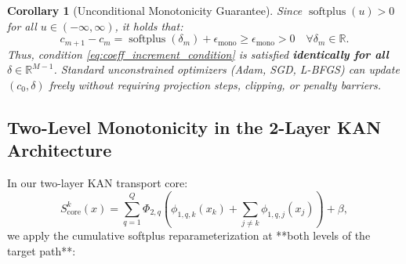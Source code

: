 \documentclass[11pt,a4paper]{article}
\theoremstyle{plain}
\newtheorem{corollary}[theorem]{Corollary}
\theoremstyle{definition}
\theoremstyle{remark}
\begin{document}
\begin{corollary}[Unconditional Monotonicity Guarantee]
Since $\operatorname{softplus}(u) > 0$ for all $u \in (-\infty, \infty)$, it holds that:
\begin{equation}
    c_{m+1} - c_m = \operatorname{softplus}(\delta_m) + \epsilon_{\text{mono}} \ge \epsilon_{\text{mono}} > 0 \quad \forall \delta_m \in \mathbb{R}.
\end{equation}
Thus, condition \eqref{eq:coeff_increment_condition} is satisfied \textbf{identically for all $\delta \in \mathbb{R}^{M-1}$}. Standard unconstrained optimizers (Adam, SGD, L-BFGS) can update $(c_0, \delta)$ freely without requiring projection steps, clipping, or penalty barriers.
\end{corollary}

\subsection{Two-Level Monotonicity in the 2-Layer KAN Architecture}

In our two-layer KAN transport core:
\begin{equation}
    S^k_{\text{core}}(x) = \sum_{q=1}^Q \Phi_{2, q}\left( \phi_{1, q, k}(x_k) + \sum_{j \neq k} \phi_{1, q, j}(x_j) \right) + \beta,
\end{equation}
we apply the cumulative softplus reparameterization at **both levels of the target path**:
\end{document}
